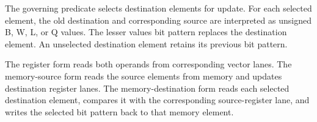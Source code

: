 The governing predicate selects destination elements for update. For each
selected element, the old destination and corresponding source are interpreted
as unsigned B, W, L, or Q values. The lesser value\textquotesingle{}s bit pattern replaces the
destination element. An unselected destination element retains its previous bit
pattern.

The register form reads both operands from corresponding vector lanes. The
memory-source form reads the source elements from memory and updates destination
register lanes. The memory-destination form reads each selected destination
element, compares it with the corresponding source-register lane, and writes
the selected bit pattern back to that memory element.
